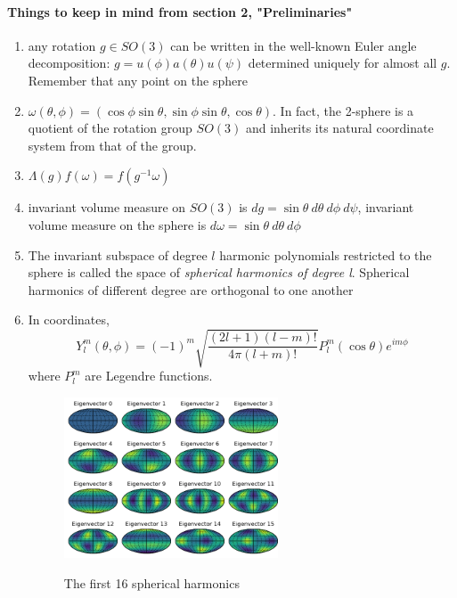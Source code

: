\paragraph{Things to keep in mind from section 2, "Preliminaries"}
\begin{enumerate}
	\item any rotation $g\in SO(3)$ can be written in the well-known Euler angle decomposition: $g = u(\phi)a(\theta)u(\psi)$ determined uniquely for almost all $g$. Remember that any point on the sphere
	\item $\omega(\theta, \phi) = \left(\cos\phi\sin\theta, \sin\phi\sin\theta, \cos\theta\right)$. In fact, the 2-sphere is a quotient of the rotation group $SO(3)$ and inherits its natural coordinate system from that of the group.
	\item $\Lambda(g)f(\omega) = f(g^{-1}\omega)$
	\item invariant volume measure on $SO(3)$ is $dg=\sin\theta\ d\theta\ d\phi\ d\psi$, invariant volume measure on the sphere is $d\omega = \sin\theta\ d\theta\ d\phi$
	\item The invariant subspace of degree $l$ harmonic polynomials restricted to the sphere is called the space of \textit{spherical harmonics of degree l}. Spherical harmonics of different degree are orthogonal to one another
	\item In coordinates, 
	$$Y_l^m(\theta, \phi) =(-1)^m\sqrt{\frac{(2l+1)(l-m)!}{4\pi(l+m)!}}P_l^m(\cos\theta)e^{im\phi}$$
	where $P_l^m$ are Legendre functions.
	\begin{figure}
		\centering
		\includegraphics[width=0.6\textwidth]{../codes/03.FEM_laplacian/HEALPix/img/linear_FEM_8_eigenvectors.png}	
		\label{fig:spherical harmonics}
		\caption{The first 16 spherical harmonics}
	\end{figure}
	

\end{enumerate}
